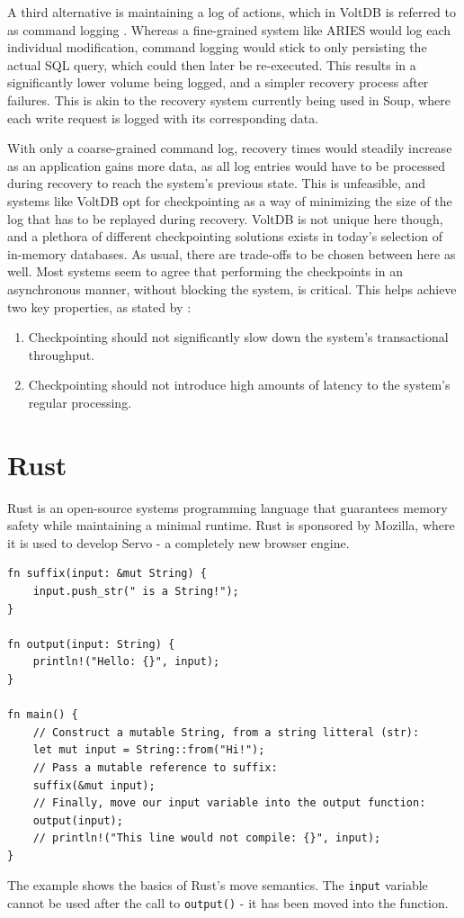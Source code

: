 \documentclass[b5paper]{report}
\begin{document}
A third alternative is maintaining a log of actions, which in VoltDB is referred
to as command logging \cite{voltdb-recovery}. Whereas a fine-grained system like
ARIES would log each individual modification, command logging would stick to
only persisting the actual SQL query, which could then later be re-executed.
This results in a significantly lower volume being logged, and a simpler
recovery process after failures. This is akin to the recovery system currently
being used in Soup, where each write request is logged with its corresponding
data.

With only a coarse-grained command log, recovery times would steadily increase
as an application gains more data, as all log entries would have to be processed
during recovery to reach the system's previous state. This is unfeasible, and
systems like VoltDB opt for checkpointing as a way of minimizing the size of the
log that has to be replayed during recovery. VoltDB is not unique here though,
and a plethora of different checkpointing solutions exists in today's selection
of in-memory databases. As usual, there are trade-offs to be chosen between here
as well. Most systems seem to agree that performing the checkpoints in an
asynchronous manner, without blocking the system, is critical. This helps
achieve two key properties, as stated by \cite{memory-checkpoint}:

\begin{enumerate}
  \item Checkpointing should not significantly slow down the system's
    transactional throughput.
  \item Checkpointing should not introduce high amounts of latency to the
    system's regular processing.
\end{enumerate}

\section{Rust}
Rust \cite{rust} is an open-source systems programming language that guarantees memory
safety while maintaining a minimal runtime. Rust is sponsored by Mozilla, where
it is used to develop Servo - a completely new browser engine.

\begin{listing}[H]
  \begin{verbatim}
fn suffix(input: &mut String) {
    input.push_str(" is a String!");
}

fn output(input: String) {
    println!("Hello: {}", input);
}

fn main() {
    // Construct a mutable String, from a string litteral (str):
    let mut input = String::from("Hi!");
    // Pass a mutable reference to suffix:
    suffix(&mut input);
    // Finally, move our input variable into the output function:
    output(input);
    // println!("This line would not compile: {}", input);
}
  \end{verbatim}
  \caption{
    The example shows the basics of Rust's move semantics. The \texttt{input}
    variable cannot be used after the call to \texttt{output()} - it has been
    moved into the function.
  }
\end{listing}
\end{document}
